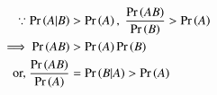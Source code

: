 \begin{align}
    \label{eq:12.13.6.18.1}
	\because	\pr{A|B} &> \pr{A},\
\frac{\pr{AB}}{\pr{B}} > \pr{A}
\\
    \label{eq:12.13.6.18.2}
	\implies \pr{AB} &> \pr{A}\pr{B}
	\\
	\text{or, } \frac{\pr{AB}}{\pr{A}} &=\pr{B|A} > \pr{A}
\end{align}
